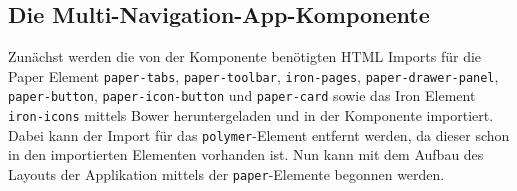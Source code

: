 \subsection{Die Multi-Navigation-App-Komponente}\label{die-multi-navigation-app-komponente}

Zunächst werden die von der Komponente benötigten \ac{HTML} Imports für die Paper Element \texttt{paper-tabs}, \texttt{paper-toolbar}, \texttt{iron-pages}, \texttt{paper-drawer-panel}, \texttt{paper-button}, \texttt{paper-icon-button} und \texttt{paper-card} sowie das Iron Element \texttt{iron-icons} mittels Bower heruntergeladen und in der Komponente importiert. Dabei kann der Import für das \texttt{polymer}-Element entfernt werden, da dieser schon in den importierten Elementen vorhanden ist. Nun kann mit dem Aufbau des Layouts der Applikation mittels der \texttt{paper}-Elemente begonnen werden.


